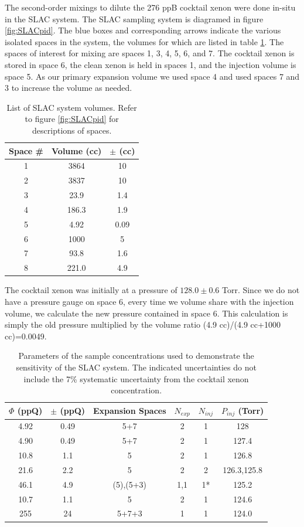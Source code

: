 \documentclass[12pt]{article}
\begin{document}
The second-order mixings to dilute the 276 ppB cocktail xenon were done in-situ in the SLAC system. The SLAC sampling system is diagramed in figure \ref{fig:SLACpid}. The blue boxes and corresponding arrows indicate the various isolated spaces in the system, the volumes for which are listed in table \ref{tab:SLACvols}. The spaces of interest for mixing are spaces 1, 3, 4, 5, 6, and 7. The cocktail xenon is stored in space 6, the clean xenon is held in spaces 1, and the injection volume is space 5. As our primary expansion volume we used space 4 and used spaces 7 and 3 to increase the volume as needed.
\begin{table}[h!]
\centering
 \label{tab:SLACvols}
 \begin{tabular}{ c | c | c }
 \hline
 \hline
 Space \# & Volume (cc) & $\pm$ (cc) \\ 
 \hline\hline
1 & 3864 & 10 \\ 
2 & 3837 & 10 \\
3 & 23.9 & 1.4 \\
4 & 186.3 &1.9 \\
5 & 4.92 & 0.09 \\
6 & 1000 & 5 \\
7 & 93.8 & 1.6 \\
8 & 221.0 & 4.9 \\
 \hline
 \hline
\end{tabular}
\caption{List of SLAC system volumes. Refer to figure \ref{fig:SLACpid} for descriptions of spaces.}
\end{table}

The cocktail xenon was initially at a pressure of $128.0\pm0.6$ Torr. Since we do not have a pressure gauge on space 6, every time we volume share with the injection volume, we calculate the new pressure contained in space 6. This calculation is simply the old pressure multiplied by the volume ratio (4.9 cc)/(4.9 cc+1000 cc)=0.0049.
 \begin{table}[h!]
 \centering
 \label{tab:concentrations}
 \begin{tabular}{ c | c | c | c | c | c}
 \hline
 \hline
 $\Phi$ (ppQ) & $\pm$ (ppQ) &  Expansion Spaces & $N_{exp}$ & $N_{inj}$ & $P_{inj}$ (Torr) \\ 
 \hline
 \hline
4.92 & 0.49 & 5+7 & 2 & 1 & 128 \\ 
4.90 & 0.49 & 5+7 & 2 & 1 & 127.4 \\ 
10.8 & 1.1 & 5 & 2 & 1 &126.8 \\
21.6 & 2.2 & 5 & 2 & 2 & 126.3,125.8 \\
46.1 & 4.9 & (5),(5+3) & 1,1 & 1* & 125.2 \\
10.7 & 1.1 & 5 & 2 & 1 & 124.6 \\
255 & 24 & 5+7+3 & 1 & 1 & 124.0 \\
 \hline
 \hline
\end{tabular}
\caption{Parameters of the sample concentrations used to demonstrate the sensitivity of the SLAC system. The indicated uncertainties do not include the 7\% systematic uncertainty from the cocktail xenon concentration.}
\end{table}
\end{document}
